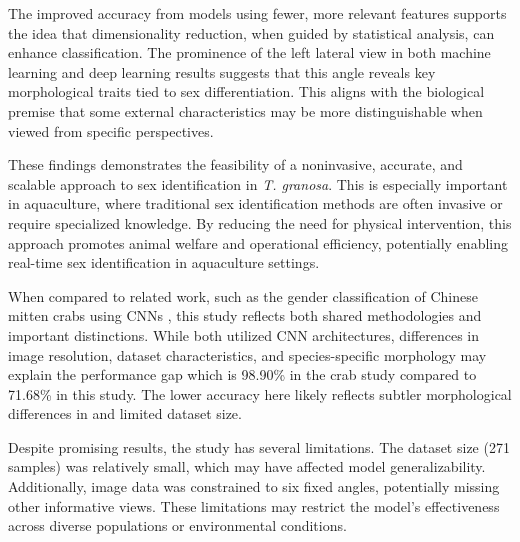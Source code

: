 The improved accuracy from models using fewer, more relevant features supports the idea that dimensionality reduction, when guided by statistical analysis, can enhance classification. The prominence of the left lateral view in both machine learning and deep learning results suggests that this angle reveals key morphological traits tied to sex differentiation. This aligns with the biological premise that some external characteristics may be more distinguishable when viewed from specific perspectives.

These findings demonstrates the feasibility of a noninvasive, accurate, and scalable approach to sex identification in \textit{T. granosa}. This is especially important in aquaculture, where traditional sex identification methods are often invasive or require specialized knowledge. By reducing the need for physical intervention, this approach promotes animal welfare and operational efficiency, potentially enabling real-time sex identification in aquaculture settings.

When compared to related work, such as the gender classification of Chinese mitten crabs using CNNs \cite{cui2020}, this study reflects both shared methodologies and important distinctions. While both utilized CNN architectures, differences in image resolution, dataset characteristics, and species-specific morphology may explain the performance gap which is 98.90\% in the crab study compared to 71.68\% in this study. The lower accuracy here likely reflects subtler morphological differences in \Tgranosa and limited dataset size.

Despite promising results, the study has several limitations. The dataset size (271 samples) was relatively small, which may have affected model generalizability. Additionally, image data was constrained to six fixed angles, potentially missing other informative views. These limitations may restrict the model’s effectiveness across diverse populations or environmental conditions.